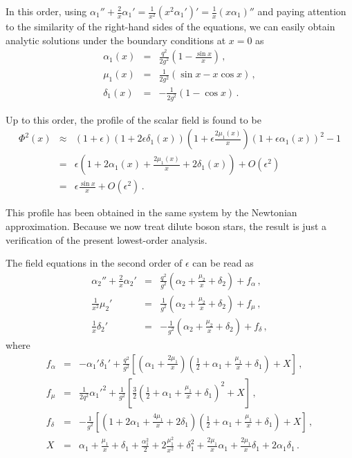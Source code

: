 \documentclass[
aps,prd,
12pt,%
nopreprintnumbers,
showpacs,
eqsecnum,
nofootinbib
]{revtex4-1}
\begin{document}
In this order, 
using $\alpha_1''+\frac{2}{x}\alpha_1'=\frac{1}{x^2}(x^2\alpha_1')'
=\frac{1}{x}(x\alpha_1)''$ and paying attention to the similarity of the
right-hand sides of the equations,
we can easily obtain analytic
solutions under the boundary conditions at $x=0$ as
\begin{eqnarray}
\alpha_1(x)&=&\frac{q^2}{2g^2}\left(1-\frac{\sin x}{x}\right)
\,,\\
\mu_{1}(x)&=&\frac{1}{2g^2}
\left(\sin x-x\cos x\right)\,,\\
\delta_1(x)&=&-\frac{1}{2g^2}\left(1-\cos x\right)\,.
\end{eqnarray}

Up to this order, the profile of the scalar field is found to be
\begin{eqnarray}
\Phi^2(x)&\approx& (1+\epsilon)(1+2\epsilon\delta_1(x))
\left(1+\epsilon\frac{2\mu_{1}(x)}{x}\right)(1+\epsilon\alpha_1(x))^2-1\nonumber \\
&=&\epsilon\left(1+2\alpha_1(x)+\frac{2\mu_{1}(x)}{x}+2\delta_1(x)\right)
+O(\epsilon^2)\nonumber \\
&=&\epsilon\frac{\sin x}{x}+O(\epsilon^2)\,.
\end{eqnarray}

This profile has been obtained in the same system by the Newtonian approximation.
Because we now treat dilute boson stars, the result is just a verification of the
present lowest-order analysis.

The field equations in the second order of $\epsilon$ can be read as
\begin{eqnarray}
\alpha_2''+\frac{2}{x}\alpha_2'&=&\frac{q^2}{g^2}\left(%
\alpha_2+
\frac{\mu_{2}}{x}+\delta_2\right)+f_\alpha
\,,\\
\frac{1}{x^2}\mu_{2}'&=&\frac{1}{g^2}
\left(%
\alpha_2+\frac{\mu_{2}}{x}+\delta_2\right)+f_\mu\,,\\
\frac{1}{x}\delta_2'&=&-\frac{1}{g^2}\left(%
\alpha_2+
\frac{\mu_{2}}{x}+\delta_2\right)+f_\delta\,,
\end{eqnarray}
where
\begin{eqnarray}
f_\alpha&=&-\alpha_1'\delta_1'+\frac{q^2}{g^2}\left[
\left(\alpha_1+\frac{2\mu_{1}}{x}\right)
\left(\frac{1}{2}+\alpha_1+\frac{\mu_{1}}{x}+\delta_1\right)
+X\right]
\,,\\
f_\mu&=&\frac{1}{2q^2}\alpha_1'^2+\frac{1}{g^2}\left[
\frac{3}{2}
\left(\frac{1}{2}+\alpha_1+\frac{\mu_{1}}{x}+\delta_1\right)^2
+X\right]\,,\\
f_\delta&=&-\frac{1}{g^2}\left[
\left(1+2\alpha_1+\frac{4\mu_{1}}{x}+2\delta_1\right)
\left(\frac{1}{2}+\alpha_1+\frac{\mu_{1}}{x}+\delta_1\right)
+X\right]\,,\\
X&=&\alpha_1+\frac{\mu_{1}}{x}+\delta_1+
\frac{\alpha_1^2}{2}+2\frac{\mu_{1}^2}{x^2}+\delta_1^2+
\frac{2\mu_{1}}{x}\alpha_1+\frac{2\mu_{1}}{x}\delta_1+2\alpha_1\delta_1\,.
\end{eqnarray}
\end{document}
